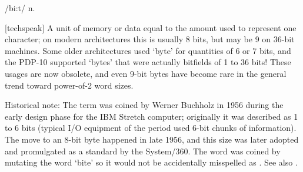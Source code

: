  /bi:t/ n.

[techspeak] A unit of memory or data equal to the amount used to represent one
character; on modern architectures this is usually 8 bits, but may be 9 on
36-bit machines. Some older architectures used `byte' for quantities of 6 or 7
bits, and the PDP-10 supported `bytes' that were actually bitfields of 1 to 36
bits! These usages are now obsolete, and even 9-bit bytes have become rare in
the general trend toward power-of-2 word sizes.

Historical note: The term was coined by Werner Buchholz in 1956 during the early
design phase for the IBM Stretch computer; originally it was described as 1 to 6
bits (typical I/O equipment of the period used 6-bit chunks of information). The
move to an 8-bit byte happened in late 1956, and this size was later adopted and
promulgated as a standard by the System/360. The word was coined by mutating the
word `bite' so it would not be accidentally misspelled as . See
also .

